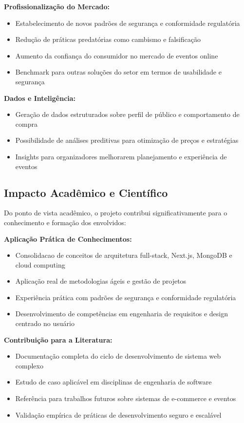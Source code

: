 \textbf{Profissionalização do Mercado:}
\begin{itemize}
    \item Estabelecimento de novos padrões de segurança e conformidade regulatória
    \item Redução de práticas predatórias como cambismo e falsificação
    \item Aumento da confiança do consumidor no mercado de eventos online
    \item Benchmark para outras soluções do setor em termos de usabilidade e segurança
\end{itemize}

\textbf{Dados e Inteligência:}
\begin{itemize}
    \item Geração de dados estruturados sobre perfil de público e comportamento de compra
    \item Possibilidade de análises preditivas para otimização de preços e estratégias
    \item Insights para organizadores melhorarem planejamento e experiência de eventos
\end{itemize}

\subsection{Impacto Acadêmico e Científico}

Do ponto de vista acadêmico, o projeto contribui significativamente para o conhecimento e formação dos envolvidos:

\textbf{Aplicação Prática de Conhecimentos:}
\begin{itemize}
    \item Consolidacao de conceitos de arquitetura full-stack, Next.js, MongoDB e cloud computing
    \item Aplicação real de metodologias ágeis e gestão de projetos
    \item Experiência prática com padrões de segurança e conformidade regulatória
    \item Desenvolvimento de competências em engenharia de requisitos e design centrado no usuário
\end{itemize}

\textbf{Contribuição para a Literatura:}
\begin{itemize}
    \item Documentação completa do ciclo de desenvolvimento de sistema web complexo
    \item Estudo de caso aplicável em disciplinas de engenharia de software
    \item Referência para trabalhos futuros sobre sistemas de e-commerce e eventos
    \item Validação empírica de práticas de desenvolvimento seguro e escalável
\end{itemize}

